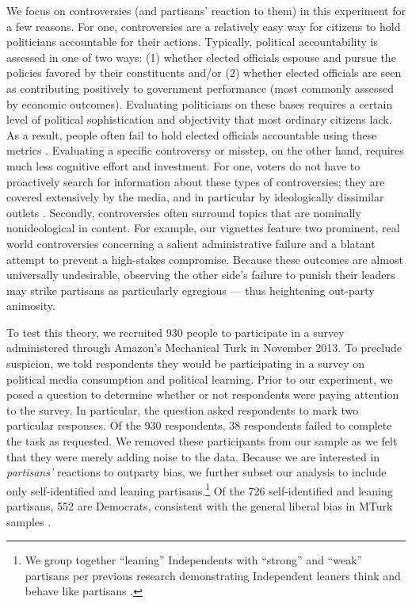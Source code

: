 \documentclass[12pt, letterpaper]{article}
\begin{document}
We focus on controversies (and partisans' reaction to them) in this experiment for a few reasons. For one, controversies are a relatively easy way for citizens to hold politicians accountable for their actions. Typically, political accountability is assessed in one of two ways:  (1) whether elected officials espouse and pursue the policies favored by their constituents and/or (2) whether elected officials are seen as contributing positively to government performance (most commonly assessed by economic outcomes). Evaluating politicians on these bases requires a certain level of political sophistication and objectivity that most ordinary citizens lack. As a result, people often fail to hold elected officials accountable using these metrics \citep[e.g.,][]{achen2016democracy,Bartels2008,healylenz_2014,Lenz2012,snidermanstiglitz_2012,soodiyengar_2014}. Evaluating a specific controversy or misstep, on the other hand, requires much less cognitive effort and investment. For one, voters do not have to proactively search for information about these types of controversies; they are covered extensively by the media, and in particular by ideologically dissimilar outlets \citep{budaketal_2016,puglisisnyder_2011}. Secondly, controversies often surround topics that are nominally nonideological in content. For example, our vignettes feature two prominent, real world controversies concerning a salient administrative failure and a blatant attempt to prevent a high-stakes compromise. Because these outcomes are almost universally undesirable, observing the other side's failure to punish their leaders may strike partisans as particularly egregious --- thus heightening out-party animosity. 

To test this theory, we recruited 930 people to participate in a survey administered through Amazon's Mechanical Turk in November 2013. To preclude suspicion, we told respondents they would be participating in a survey on political media consumption and political learning. Prior to our experiment, we posed a question to determine whether or not respondents were paying attention to the survey. In particular, the question asked respondents to mark two particular responses. Of the 930 respondents, 38 respondents failed to complete the task as requested. We removed these participants from our sample as we felt that they were merely adding noise to the data. Because we are interested in \textit{partisans'} reactions to outparty bias, we further subset our analysis to include only self-identified and leaning partisans.\footnote{We group together ``leaning'' Independents with ``strong'' and ``weak'' partisans per previous research demonstrating Independent leaners think and behave like partisans \citep{keithetal_1992}.} Of the 726 self-identified and leaning partisans, 552 are Democrats, consistent with the general liberal bias in MTurk samples \citep{BerinskyHuberLenz2012}. 
\end{document}
